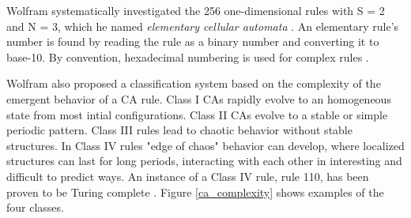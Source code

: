 \documentclass{elsarticle}
\begin{document}
\begin{multicols}{2}
\par Wolfram systematically 
investigated the 256 one-dimensional rules with S = 2 and N = 3, which he named 
\textit{elementary cellular automata} \cite{wolfram2002new}. An elementary rule's number 
is found by reading the rule as a binary number and converting it to base-10.  
By convention, hexadecimal numbering is used for complex rules 
\cite{wuensche1999classifying}.

Wolfram also proposed a classification system based on the complexity of the 
emergent behavior of a CA rule. Class I CAs rapidly evolve to an homogeneous 
state from most  intial configurations.  Class II CAs evolve to a stable or 
simple periodic pattern.  Class III rules lead to chaotic behavior without 
stable structures.  In Class IV rules "edge of chaos" behavior can develop, 
       where localized structures can last for long periods, interacting with 
       each other in interesting and difficult to predict ways. An instance of 
       a Class IV rule, rule 110, has been proven to be Turing complete 
       \cite{cook2004universality}. Figure \ref{ca_complexity} shows examples 
       of the four classes.  \par


\end{multicols}
\end{document}
